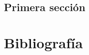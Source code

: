 \documentclass[12pt,a4paper,]{book}
\def\ifdoblecara{} %
\def\ifcitapandoc{} %
\let\ifcitapandoc\undefined %
\numberwithin{dummy}{section}
\theoremstyle{ocrenumbox}
\theoremstyle{blacknumex}
\theoremstyle{blacknumbox}
\theoremstyle{ocrenum}
\theoremstyle{ocrenum}
\begin{document}
\hypertarget{primera-secciuxf3n-5}{%
\section{Primera sección}\label{primera-secciuxf3n-5}}

\FloatBarrier
\cleardoublepage

\ifdefined\ifdoblecara
  \fancyhead[LE,RO]{}
  \fancyfoot[LO,RE]{}
\else
  \fancyhead[RO]{}
  \fancyfoot[LO]{}
\fi

\ifdefined\ifcitapandoc

\hypertarget{bibliografuxeda}{%
\chapter*{Bibliografía}\label{bibliografuxeda}}

\else

\nocite{Luque2017,MongoDB,RStudio,Python2020}

\fi




\end{document}

